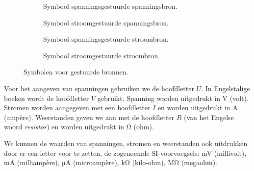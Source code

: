 \begin{figure}[!ht]
\centering
\begin{subfigure}{0.23\textwidth}
\centering
{}
\caption{Symbool spanningsgestuurde spanningsbron.}
\end{subfigure}
\begin{subfigure}{0.23\textwidth}
\centering
{}
\caption{Symbool stroomgestuurde spanningsbron.}
\end{subfigure}
\begin{subfigure}{0.23\textwidth}
\centering
{}
\caption{Symbool spanningsgestuurde stroombron.}
\end{subfigure}
\begin{subfigure}{0.23\textwidth}
\centering
{}
\caption{Symbool stroomgestuurde stroombron.}
\end{subfigure}
\caption{Symbolen voor gestuurde bronnen.}
\label{fig:gelsymbolengestuuurdebronnenen}
\end{figure}

Voor het aangeven van spanningen gebruiken we de hoofdletter $U$. In Engelstalige boeken
wordt de hoofdletter $V$ gebruikt. Spanning worden uitgedrukt in \si{\volt} (volt). Stromen
worden aangegeven met een hoofdletter $I$ en worden uitgedrukt in \si{\ampere} (amp\`ere).
Weerstanden geven we aan met de hoofdletter $R$ (van het Engelse woord \textsl{resistor})
en worden uitgedrukt in \si{\ohm} (ohm).

We kunnen de waarden van spanningen, stromen en weerstanden ook uitdrukken door er een
letter voor te zetten, de zogenoemde SI-voorvoegsels: \si{\milli\volt} (millivolt),
\si{\milli\ampere} (milliamp\`ere), \si{\micro\ampere} (microamp\`ere), \si{\kilo\ohm}
(kilo-ohm), \si{\mega\ohm} (megaohm).

